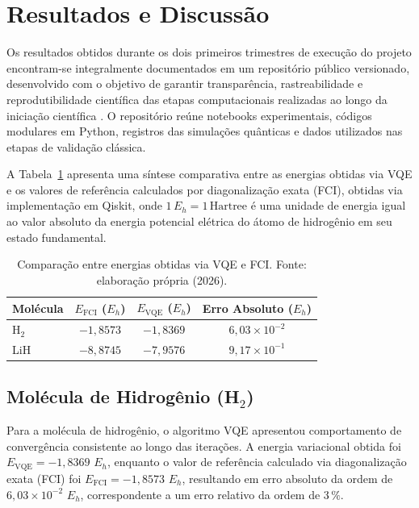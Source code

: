 \section{Resultados e Discussão}

Os resultados obtidos durante os dois primeiros trimestres de execução do
projeto encontram-se integralmente documentados em um repositório público
versionado, desenvolvido com o objetivo de garantir transparência,
rastreabilidade e reprodutibilidade científica das etapas computacionais
realizadas ao longo da iniciação científica \cite{leao2026vqe}.
O repositório reúne notebooks experimentais, códigos modulares em Python,
registros das simulações quânticas e dados utilizados nas etapas de
validação clássica.

A Tabela~\ref{tab:energy_comparison} apresenta uma síntese comparativa
entre as energias obtidas via VQE e os valores de referência calculados
por diagonalização exata (FCI), obtidas via implementação em Qiskit, onde $1\,E_h =1\, \text{Hartree}$ é uma unidade de energia igual ao valor absoluto da energia potencial elétrica do átomo de hidrogênio em seu estado fundamental.
\begin{table}[H]
\label{tab:energy_comparison}
\centering
\caption{Comparação entre energias obtidas via VQE e FCI. Fonte: elaboração própria (2026).}
\vspace{10pt}
\begin{tabular}{lccc}
\hline
Molécula & $E_{\text{FCI}}$ ($E_h$) & $E_{\text{VQE}}$ ($E_h$) & Erro Absoluto ($E_h$) \\
\hline
H$_2$  & $-1,8573$ & $-1,8369$ & $6,03 \times 10^{-2}$ \\
LiH    & $-8,8745$ & $-7,9576$ & $9,17 \times 10^{-1}$ \\
\hline
\end{tabular}
\end{table}



\subsection{Molécula de Hidrogênio (\texorpdfstring{H$_2$}{H2})}

Para a molécula de hidrogênio, o algoritmo VQE apresentou
comportamento de convergência consistente ao longo das iterações.
A energia variacional obtida foi
$E_{\text{VQE}} = -1,8369$ $E_h$, enquanto o valor de referência
calculado via diagonalização exata (FCI) foi
$E_{\text{FCI}} = -1,8573$ $E_h$, resultando em erro absoluto
da ordem de $6,03 \times 10^{-2}$ $E_h$, correspondente a um erro
relativo da ordem de $3\,\%$.


